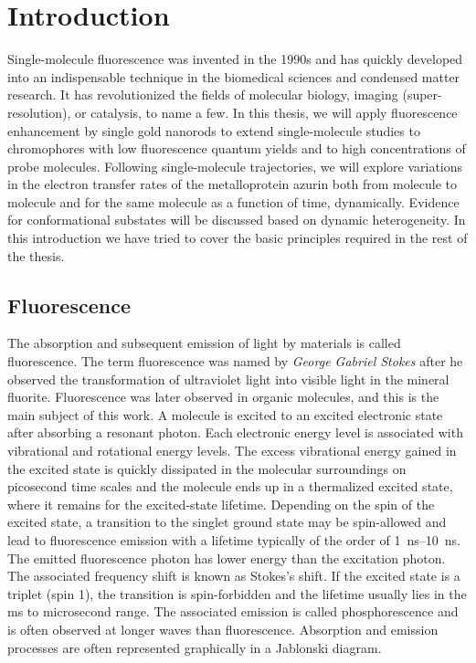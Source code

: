 \chapter{Introduction}
\label{chapter:intro}
\graphicspath{{./chapters/c1_intro/figures/}}
Single-molecule fluorescence was invented in the 1990s and has quickly developed into an indispensable technique in the biomedical sciences and condensed matter research. It has revolutionized the fields of molecular biology, imaging (super-resolution), or catalysis, to name a few. In this thesis, we will apply fluorescence enhancement by single gold nanorods to extend single-molecule studies to chromophores with low fluorescence quantum yields and to high concentrations of probe molecules. Following single-molecule trajectories, we will explore variations in the electron transfer rates of the metalloprotein azurin both from molecule to molecule and for the same molecule as a function of time, dynamically. Evidence for conformational substates will be discussed based on dynamic heterogeneity. In this introduction we have tried to cover the basic principles required in the rest of the thesis.  


\section{Fluorescence}
The absorption and subsequent emission of light by materials is called fluorescence.
The term fluorescence was named by \textit{George Gabriel Stokes} after he observed the transformation of ultraviolet light into visible light in the mineral fluorite.\cite{Stokes1852} Fluorescence was later observed in organic molecules, and this is the main subject of this work.
A molecule is excited to an excited electronic state after absorbing a resonant photon.
Each electronic energy level is associated with vibrational and rotational energy levels.
The excess vibrational energy gained in the excited state is quickly dissipated in the molecular surroundings on picosecond time scales and the molecule ends up in a thermalized excited state, where it remains for the excited-state lifetime. Depending on the spin of the excited state, a transition to the singlet ground state may be spin-allowed and lead to fluorescence emission with a lifetime typically of the order of \SIrange{1}{10}{\ns}. The emitted fluorescence photon has lower energy than the excitation photon. The associated frequency shift is known as Stokes's shift.
If the excited state is a triplet (spin 1), the transition is spin-forbidden and the lifetime usually lies in the ms to microsecond range. The associated emission is called  phosphorescence and is often observed at longer waves than fluorescence.
Absorption and emission processes are often represented graphically in a Jablonski diagram.\cite{RohatgiMukherjee1979k,Lakowicz1999book}

